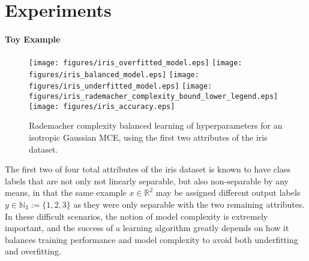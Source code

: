 \documentclass[twoside]{article}
\begin{document}
	\section{Experiments}
	\label{sec:experiments}
	
	\paragraph{Toy Example}
	
	\begin{figure*}[t]
		\centering
		\texttt{[image: figures/iris\_overfitted\_model.eps]}
		\texttt{[image: figures/iris\_balanced\_model.eps]}
		\texttt{[image: figures/iris\_underfitted\_model.eps]}
		\texttt{[image: figures/iris\_rademacher\_complexity\_bound\_lower\_legend.eps]}
		\texttt{[image: figures/iris\_accuracy.eps]}
		\caption{Rademacher complexity balanced learning of hyperparameters for an isotropic Gaussian \gls{MCE}, using the first two attributes of the iris dataset.}
		\label{fig:iris}
	\end{figure*}
	
	The first two of four total attributes of the iris dataset \citep{fisher1936use} is known to have class labels that are not only not linearly separable, but also non-separable by any means, in that the same example $x \in \mathbb{R}^{2}$ may be assigned different output labels $y \in \mathbb{N}_{3} := \{1, 2, 3\}$ as they were only separable with the two remaining attributes. In these difficult scenarios, the notion of model complexity is extremely important, and the success of a learning algorithm greatly depends on how it balances training performance and model complexity to avoid both underfitting and overfitting. 
	
\end{document}
